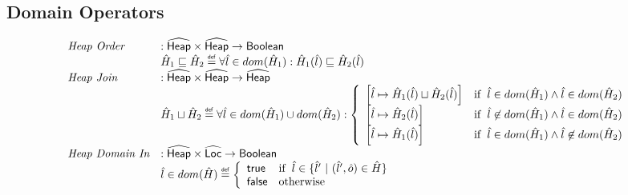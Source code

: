 \documentclass{article}
\newcommand{\SF}[1]{\mbox{\textsf{#1}}}
\newcommand{\ifc}[1]{{\rm if}\begin{array}[t]{l}#1\end{array}}
\newcommand{\owc}{{\rm otherwise}}
\newcommand{\abs}[1]{\widehat{\SF{#1}}}
\newcommand{\aHeap}{\abs{Heap}}
\newcommand{\aLoc}{\abs{Loc}}
\newcommand{\defi}{\stackrel{\tiny \SF{def}}{=}}
\begin{document}
\subsection{Domain Operators}
\[
\begin{array}{ll}
\textit{Heap Order} & : \aHeap \times \aHeap \rightarrow \SF{Boolean} \\
& \hat{H}_1 \sqsubseteq \hat{H}_2 \defi \forall \hat{l} \in dom(\hat{H}_1):
      \hat{H}_1(\hat{l}) \sqsubseteq \hat{H}_2(\hat{l})
\\

\textit{Heap Join} & : \aHeap \times \aHeap \rightarrow \aHeap \\
& \hat{H}_1 \sqcup \hat{H}_2  \defi \forall \hat{l} \in dom(\hat{H}_1) \cup dom(\hat{H}_2): 
  \left\{
    \begin{array}{ll}
      \left[\hat{l} \mapsto \hat{H}_1(\hat{l}) \sqcup \hat{H}_2(\hat{l})\right] & \ifc{\hat{l} \in dom(\hat{H}_1)\land \hat{l} \in dom(\hat{H}_2)}\\
      \left[\hat{l} \mapsto \hat{H}_2(\hat{l}) \right] & \ifc{\hat{l} \not\in dom(\hat{H}_1)\land \hat{l} \in dom(\hat{H}_2)}\\
      \left[\hat{l} \mapsto \hat{H}_1(\hat{l}) \right] & \ifc{\hat{l} \in dom(\hat{H}_1)\land \hat{l} \not\in dom(\hat{H}_2)}\\
    \end{array}
  \right.\\
\textit{Heap Domain In} & : \aHeap \times \aLoc \rightarrow \SF{Boolean} \\
& \hat{l} \in dom(\hat{H}) \defi
 \left\{
   \begin{array}{ll}
     \SF{true}
     & \ifc{\hat{l} \in \{ \hat{l}'\ |\ (\hat{l}', \hat{o}) \in \hat{H}\}} \\
     \SF{false}
     & \owc \\
   \end{array}
 \right.\\


\end{array}\]
\end{document}

